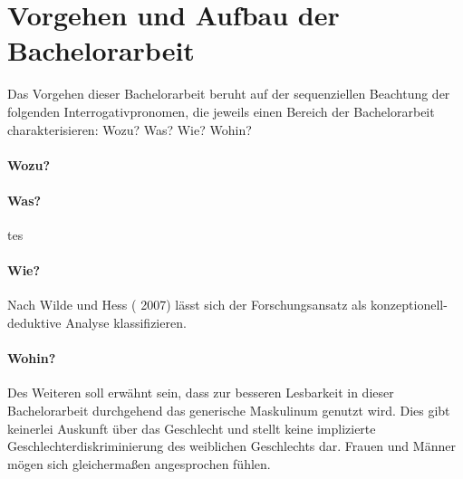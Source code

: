 \section{Vorgehen und Aufbau der Bachelorarbeit }\label{sec:Vorgehen}

Das Vorgehen dieser Bachelorarbeit beruht auf der sequenziellen Beachtung der folgenden Interrogativpronomen, die jeweils einen Bereich der Bachelorarbeit charakterisieren: Wozu? Was? Wie? Wohin?

\paragraph{Wozu?}

\paragraph{Was?}
tes


\paragraph{Wie?}
Nach Wilde und Hess ( 2007) lässt sich der Forschungsansatz als konzeptionell-deduktive Analyse klassifizieren.


\paragraph{Wohin?}

Des Weiteren soll erwähnt sein, dass zur besseren Lesbarkeit in dieser Bachelorarbeit durchgehend das generische Maskulinum genutzt wird. Dies gibt keinerlei Auskunft über das Geschlecht und stellt keine implizierte Geschlechterdiskriminierung des weiblichen Geschlechts dar. Frauen und Männer mögen sich gleichermaßen angesprochen fühlen.
